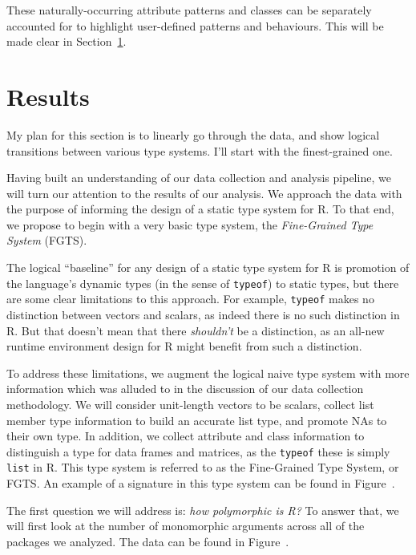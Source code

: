 \documentclass[acmsmall,10pt,review,anonymous]{acmart}\settopmatter{printfolios=true,printccs=false,printacmref=false}
\newcommand{\code}[1]{\lstinline|#1|\xspace}
\begin{document}
These naturally-occurring attribute patterns and classes can be separately accounted for to highlight user-defined patterns and behaviours.
This will be made clear in Section~\ref{sec:results}.

%
%
%
%
%
%
\section{Results}
\label{sec:results}

My plan for this section is to linearly go through the data, and show logical transitions between various type systems.
I'll start with the finest-grained one.

Having built an understanding of our data collection and analysis pipeline, we will turn our attention to the results of our analysis.
We approach the data with the purpose of informing the design of a static type system for R.
To that end, we propose to begin with a very basic type system, the {\it Fine-Grained Type System} (FGTS).

The logical ``baseline'' for any design of a static type system for R is promotion of the language's dynamic types (in the sense of \code{typeof}) to static types, but there are some clear limitations to this approach.
For example, \code{typeof} makes no distinction between vectors and scalars, as indeed there is no such distinction in R.
But that doesn't mean that there {\it shouldn't} be a distinction, as an all-new runtime environment design for R might benefit from such a distinction.

To address these limitations, we augment the logical naive type system with more information which was alluded to in the discussion of our data collection methodology.
We will consider unit-length vectors to be scalars, collect list member type information to build an accurate list type, and promote NAs to their own type.
In addition, we collect attribute and class information to distinguish a type for data frames and matrices, as the \code{typeof} these is simply {\tt list} in R.
This type system is referred to as the Fine-Grained Type System, or FGTS.
An example of a signature in this type system can be found in Figure~.

The first question we will address is: {\it how polymorphic is R?}
To answer that, we will first look at the number of monomorphic arguments across all of the packages we analyzed.
The data can be found in Figure~.

\end{document}
